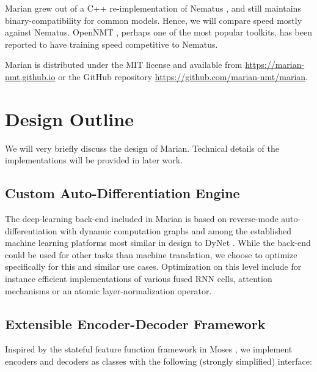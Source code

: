 \documentclass[11pt,a4paper]{article}
\begin{document}

Marian grew out of a C++ re-implementation of Nematus \cite{sennrich-EtAl:2017:EACLDemo}, and still maintains binary-compatibility for common models. Hence, we will compare speed mostly against Nematus. OpenNMT \cite{klein2017opennmt}, perhaps one of the most popular toolkits, has been reported to have training speed competitive to Nematus. 

Marian is distributed under the MIT license and available from \url{https://marian-nmt.github.io} or the GitHub repository \url{https://github.com/marian-nmt/marian}.

\section{Design Outline}

We will very briefly discuss the design of Marian. Technical details of the implementations will be provided in later work.

\subsection{Custom Auto-Differentiation Engine}

The deep-learning back-end included in Marian is based on reverse-mode auto-differentiation with dynamic computation graphs and among the established machine learning platforms most similar in design to DyNet \cite{dynet}. While the back-end could be used for other tasks than machine translation, we choose to optimize specifically for this and similar use cases. Optimization on this level include for instance efficient implementations of various fused RNN cells, attention mechanisms or an atomic layer-normalization \cite{ba2016layer} operator. 

\subsection{Extensible Encoder-Decoder Framework}
\label{encdec}

Inspired by the stateful feature function framework in Moses \cite{conf/acl/KoehnHBCFBCSMZDBCH07}, we implement encoders and decoders as classes with the following (strongly simplified) interface:
\end{document}
